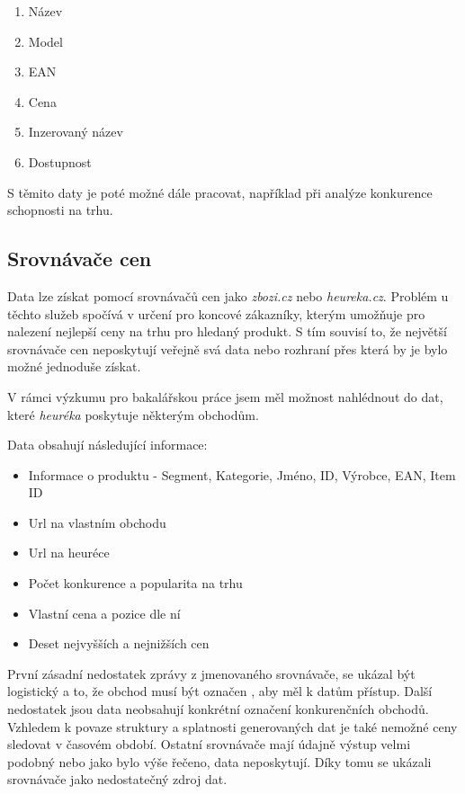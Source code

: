 \documentclass[thesis=B,czech]{FITthesis}[2012/06/26]
\begin{document}
\begin{enumerate}
\item Název
\item Model
\item EAN
\item Cena
\item Inzerovaný název
\item Dostupnost
\end{enumerate}

S těmito daty je poté možné dále pracovat, například při analýze konkurence schopnosti na trhu. \cite{hunka}

\subsection{Srovnávače cen}

Data lze získat pomocí srovnávačů cen jako \textit{zbozi.cz}\cite{heureka} 
nebo \textit{heureka.cz}\cite{zbozi}. Problém u těchto služeb spočívá v určení pro koncové zákazníky, kterým umožňuje
pro nalezení nejlepší ceny na trhu pro hledaný produkt. S tím souvisí to, že největší srovnávače cen neposkytují veřejně 
svá data nebo rozhraní přes která by je bylo možné jednoduše získat.
\par
V rámci výzkumu pro bakalářskou práce jsem měl možnost nahlédnout do dat, které \textit{heuréka} poskytuje některým obchodům. \cite{hunka}

Data obsahují následující informace:
\begin{itemize}
\item Informace o produktu - Segment, Kategorie, Jméno, ID, Výrobce, EAN, Item ID
\item Url na vlastním obchodu
\item Url na heuréce
\item Počet konkurence a popularita na trhu
\item Vlastní cena a pozice dle ní
\item Deset nejvyšších a nejnižších cen
\end{itemize}

První zásadní nedostatek zprávy z jmenovaného srovnávače, se ukázal být logistický a to, že obchod musí být označen ,
aby měl k datům přístup. Další nedostatek jsou data neobsahují konkrétní označení konkurenčních obchodů.\cite{heureka-report}
Vzhledem k povaze struktury a splatnosti generovaných dat je také nemožné ceny sledovat v časovém období.
Ostatní srovnávače mají údajně výstup velmi podobný nebo jako bylo výše řečeno, data neposkytují. Díky tomu se ukázali
srovnávače jako nedostatečný zdroj dat.\cite{hunka}
\end{document}
